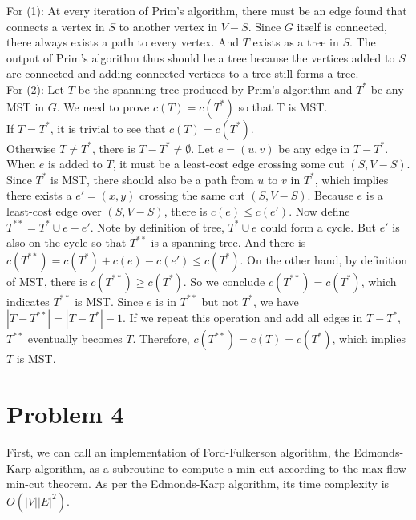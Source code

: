 \documentclass[titlepage, paper=a4, fontsize=11pt]{scrartcl} %
\numberwithin{equation}{section} %
\numberwithin{figure}{section} %
\numberwithin{table}{section} %
\begin{document}
For (1): At every iteration of Prim's algorithm, there must be an edge found that connects a vertex in $S$ to another vertex in $V-S$. Since $G$ itself is connected, there always exists a path to every vertex. And $T$ exists as a tree in $S$. The output of Prim's algorithm thus should be a tree because the vertices added to $S$ are connected and adding connected vertices to a tree still forms a tree. \\

For (2): Let $T$ be the spanning tree produced by Prim's algorithm and $T^*$ be any MST in $G$. We need to prove $c(T)=c(T^*)$ so that T is MST. \\
If $T=T^*$, it is trivial to see that $c(T)=c(T^*)$. \\
Otherwise $T \neq T^*$, there is $T-T^* \neq \emptyset$. Let $e=(u,v)$ be any edge in $T-T^*$. When
$e$ is added to $T$, it must be a least-cost edge crossing some cut $(S, V-S)$. Since $T^*$ is MST, there should also be a path from $u$ to $v$ in $T^*$, which implies there exists a $e'=(x,y)$ crossing the same cut $(S, V-S)$. Because $e$ is a least-cost edge over $(S, V-S)$, there is $c(e) \leq c(e')$. Now define $T^{**}=T^* \cup e - e'$. Note by definition of tree, $T^* \cup e$ could form a cycle. But $e'$ is also on the cycle so that $T^{**}$ is a spanning tree. And there is $c(T^{**})=c(T^*)+c(e)-c(e') \leq c(T^*)$. On the other hand, by definition of MST, there is $c(T^{**}) \geq c(T^*)$. So we conclude $c(T^{**})=c(T^*)$, which indicates $T^{**}$ is MST. Since $e$ is in $T^{**}$ but not $T^*$, we have $|T-T^{**}|=|T-T^*|-1$. If we repeat this operation and add all edges in $T-T^*$, $T^{**}$ eventually becomes $T$. Therefore, $c(T^{**})=c(T)=c(T^*)$, which implies $T$ is MST. \\






\section*{Problem 4}
First, we can call an implementation of Ford-Fulkerson algorithm, the Edmonds-Karp algorithm, as a subroutine to compute a min-cut according to the max-flow min-cut theorem. As per the Edmonds-Karp algorithm, its time complexity is $O(|V||E|^2)$. \\
\end{document}
